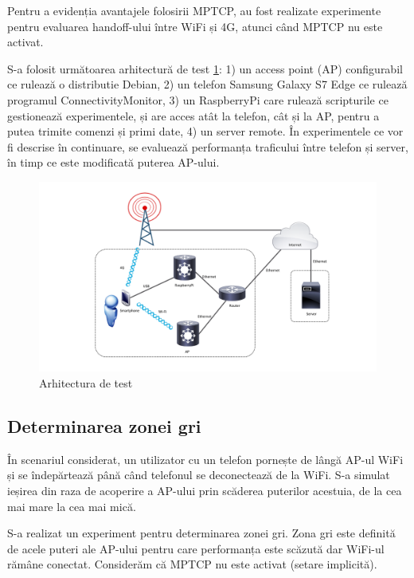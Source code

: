 Pentru a evidenția avantajele folosirii MPTCP, au fost realizate experimente pentru evaluarea handoff-ului între WiFi și 4G, atunci când MPTCP nu este activat.

S-a folosit următoarea arhitectură de test \ref{fig:topologie}: 1) un access point (AP) configurabil ce rulează o distributie Debian, 2) un telefon Samsung Galaxy S7 Edge ce rulează programul ConnectivityMonitor, 3) un RaspberryPi care rulează scripturile ce gestionează experimentele, și are acces atât la telefon, cât și la AP, pentru a putea trimite comenzi și primi date, 4) un server remote. În experimentele ce vor fi descrise în continuare, se evaluează performanța traficului între telefon și server, în timp ce este modificată puterea AP-ului. 

\begin{figure}[h!]
 	\includegraphics[scale=0.45]{figures/experiments/45G_Topology.pdf} 
	\caption{Arhitectura de test}
	\label{fig:topologie}
\end{figure}

\subsection{Determinarea zonei gri}

În scenariul considerat, un utilizator cu un telefon pornește de lângă AP-ul WiFi și se îndepărtează până când telefonul se deconectează de la WiFi. S-a simulat ieșirea din raza de acoperire a AP-ului prin scăderea puterilor acestuia, de la cea mai mare la cea mai mică. 

S-a realizat un experiment pentru determinarea zonei gri. Zona gri este definită de acele puteri ale AP-ului pentru care performanța este scăzută dar WiFi-ul rămâne conectat. Considerăm că MPTCP nu este activat (setare implicită).

